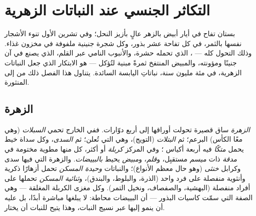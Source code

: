 \chapter{التكاثر الجنسي عند النباتات الزهرية}\label{ch:b2:angiosperm-reproduction}

بستان تفاح في أيار أبيض بالزهر عالٍ بأزيز النحل؛ وفي تشرين الأول
تنوء الأشجار نفسها بالثمر، في كل تفاحة عشر بذور، وكل  شجرة
جنينية ملفوفة في مخزون غذاء. وذلك التحول كله --- ، 
الذي تحمله حشرة، والأنبوب النامي عبر القلم،  الذي
يصنع في آن جنينًا ومؤونته، والمبيض المنتفخ ثمرةً مبنية لتُؤكل --- هو
الابتكار الذي جعل النباتات الزهرية، في مئة مليون سنة، نباتاتِ
اليابسة السائدة. يتناول هذا الفصل ذلك من  إلى 
المنثورة.

\section{الزهرة}

\begin{definition}\label{def:b2:angiosperm-reproduction:flower}
\emph{الزهرة} ساق قصيرة تحولت أوراقها إلى أربع دوّارات. ففي الخارج
تحمي \emph{السبلات} (وهي معًا الكأس) البرعم؛ ثم \emph{البتلات}
(التويج)، وهي التي تُعلن؛ ثم \emph{السدى}، وكل سداة خيط يحمل
\emph{متكًا} فيه أربعة أكياس ؛ وفي المركز \emph{كربلة} أو أكثر،
كل منها مطوية مختومة في \emph{مدقة} ذات \emph{ميسم} مستقبِل،
و\emph{قلم}، و\emph{مبيض} يحيط \emph{بالبييضات}. والزهرة التي فيها
سدى وكرابل \emph{خنثى} (وهو حال معظم الأنواع)؛ والنباتات
\emph{وحيدة المسكن} تحمل أزهارًا ذكرية وأنثوية منفصلة على فرد واحد
(الذرة، والبلوط، والبندق)، و\emph{ثنائية المسكن} تحملها على أفراد
منفصلة (البهشية، والصفصاف، ونخيل التمر). وكل مغزى الكربلة المغلقة
--- وهي الصفة التي سمّت كاسيات البذور --- أن البييضات محاطة: 
لا يبلغها مباشرة أبدًا، بل عليه أن ينمو إليها عبر نسيج النبات، وهذا
يتيح للنبات أن يختار.
\end{definition}

